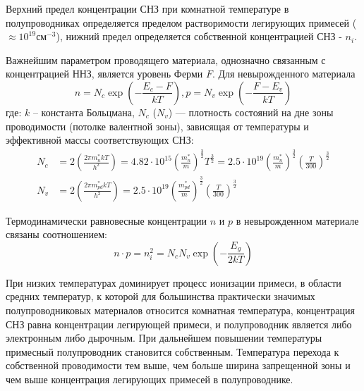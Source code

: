 Верхний предел концентрации СНЗ при комнатной температуре в полупроводниках определяется пределом растворимости легирующих примесей ($\approx 10^{19} \text{см}^{-3}$), нижний предел определяется собственной концентрацией СНЗ - $n_{i}$.

Важнейшим параметром проводящего материала, однозначно связанным с концентрацией ННЗ, является уровень Ферми $F$. Для невырожденного материала
\begin{equation}
n = N_{c} \exp \left( -\frac{E_{c}-F}{k T} \right),
p = N_{v} \exp \left( -\frac{F - E_{v}}{k T} \right)
\end{equation}
где: $k$ – константа Больцмана, $N_{c}$ ($N_{v}$) — плотность состояний на дне зоны проводимости (потолке валентной зоны), зависящая от температуры и эффективной массы соответствующих СНЗ:
\begin{equation}
\begin{split}
N_{c} &= 2 \left( \frac{2 \pi m^{*}_{n} k T}{h^2} \right) = 4.82 \cdot 10^{15} \left( \frac{m^{*}_{n}}{m} \right)^{\frac{3}{2}} T^{\frac{3}{2}} = 2.5 \cdot 10^{19} \left( \frac{m^{*}_{n}}{m} \right)^{\frac{3}{2}} \left( \frac{T}{300} \right)^{\frac{3}{2}} \\
N_{v} &= 2 \left( \frac{2 \pi m^{*}_{pd} k T}{h^2} \right) = 2.5 \cdot 10^{19} \left( \frac{m^{*}_{pd}}{m} \right)^{\frac{3}{2}} \left( \frac{T}{300} \right)^{\frac{3}{2}}
\end{split}
\end{equation}

Термодинамически равновесные концентрации $n$ и $p$ в невырожденном материале связаны соотношением:
\begin{equation}
n \cdot p = n_{i}^2 = N_{c} N_{v} \exp \left( -\frac{E_{g}}{2 k T} \right)
\end{equation}

При низких температурах доминирует процесс ионизации примеси, в области средних температур, к которой для большинства практически значимых полупроводниковых материалов относится комнатная температура, концентрация СНЗ равна концентрации легирующей примеси, и полупроводник является либо электронным либо дырочным. При дальнейшем повышении температуры примесный полупроводник становится собственным. Температура перехода к собственной проводимости тем выше, чем больше ширина запрещенной зоны и чем выше концентрация легирующих примесей в полупроводнике.

